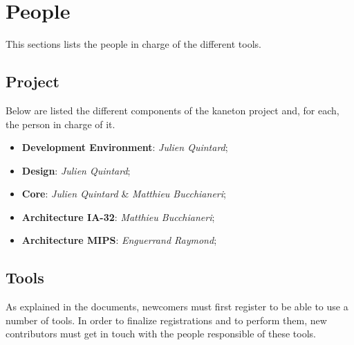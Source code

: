 %
%
%
%
%
%

%
%

\chapter{People}
\label{chapter:people}

This sections lists the people in charge of the different tools.

\newpage

%
%

%
%

\section{Project}

Below are listed the different components of the kaneton project and, for each,
the person in charge of it.

\begin{itemize}
  \item
    \textbf{Development Environment}: \textit{Julien Quintard};
  \item
    \textbf{Design}: \textit{Julien Quintard};
  \item
    \textbf{Core}: \textit{Julien Quintard} \& \textit{Matthieu Bucchianeri};
  \item
    \textbf{Architecture IA-32}: \textit{Matthieu Bucchianeri};
  \item
    \textbf{Architecture MIPS}: \textit{Enguerrand Raymond};
\end{itemize}

%
%

\section{Tools}

As explained in the documents, newcomers must first register to be able to
use a number of tools. In order to finalize registrations and to perform them,
new contributors must get in touch with the people responsible of these
tools.

